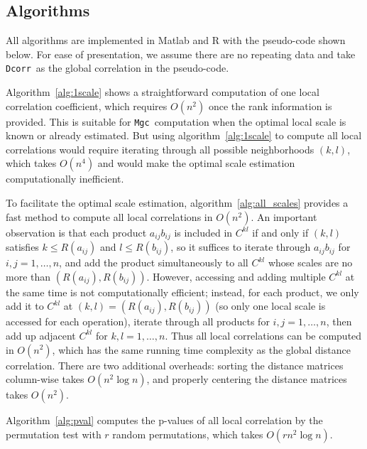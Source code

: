 \documentclass[11pt]{article}
\providecommand{\sct}[1]{{\sc \texttt{#1}}}
\newcommand{\G}{C}
\newcommand{\Mgc}{\sct{Mgc}}
\newcommand{\Dcorr}{\sct{Dcorr}}
\begin{document}
\subsection{Algorithms}
\label{appen:algorithms}
All algorithms are implemented in Matlab and R with the pseudo-code shown below. For ease of presentation, we assume there are no repeating data and take \Dcorr~as the global correlation in the pseudo-code.

Algorithm~\ref{alg:1scale} shows a straightforward computation of one local correlation coefficient, which requires $O(n^2)$ once the rank information is provided. This is suitable for \Mgc~computation when the optimal local scale is known or already estimated. But using algorithm~\ref{alg:1scale} to compute all local correlations would require iterating through all possible neighborhoods $(k,l)$, which takes $O(n^4)$ and would make the optimal scale estimation computationally inefficient.

To facilitate the optimal scale estimation, algorithm~\ref{alg:all_scales} provides a fast method to compute all local correlations in $O(n^2)$. An important observation is that each product $a_{ij}b_{ij}$ is included in $\G^{kl}$ if and only if $(k,l)$ satisfies $k\leq R(a_{ij})$ and $l\leq R(b_{ij})$, so it suffices to iterate through $a_{ij}b_{ij}$ for $i,j=1,\ldots,n$, and add the product simultaneously to all $\G^{kl}$
whose scales are no more than $(R(a_{ij}),R(b_{ij}))$. However, accessing and adding multiple $\G^{kl}$ at the same time is not computationally efficient; instead, for each product, we only add it to $\G^{kl}$ at $(k,l)=(R(a_{ij}),R(b_{ij}))$ (so only one local scale is accessed for each operation), iterate through all products for $i,j=1,\ldots,n$, then add up adjacent $\G^{kl}$ for $k,l=1,\ldots,n$. Thus all local correlations can be computed in $O(n^2)$, which has the same running time complexity as the global distance correlation. There are two additional overheads: sorting the distance matrices column-wise takes $O(n^2 \log n)$, and properly centering the distance matrices takes $O(n^2)$.

Algorithm~\ref{alg:pval} computes the p-values of all local correlation by the permutation test with $r$ random permutations, which takes $O(rn^2 \log n)$.
\end{document}
